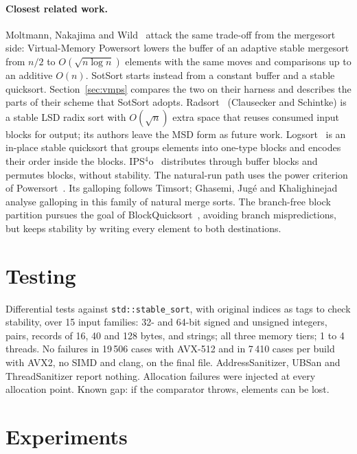 \documentclass[10pt,a4paper]{article}
\begin{document}
\paragraph{Closest related work.} Moltmann, Nakajima and Wild~\cite{vmpowersort} attack the
same trade-off from the mergesort side: Virtual-Memory Powersort lowers the buffer of an adaptive
stable mergesort from $n/2$ to $O(\sqrt{n\log n})$ elements with the same moves and comparisons
up to an additive $O(n)$. SotSort starts instead from a constant buffer and a stable quicksort.
Section~\ref{sec:vmps} compares the two on their harness and describes the parts of their
scheme that SotSort adopts. Radsort~\cite{radsort} (Clausecker and Schintke) is a stable LSD
radix sort with $O(\sqrt n)$ extra space that reuses consumed input blocks for output; its authors
leave the MSD form as future work. Logsort~\cite{logsort} is an in-place stable quicksort that
groups elements into one-type blocks and encodes their order inside the blocks. IPS$^4$o~\cite{ips4o}
distributes through buffer blocks and permutes blocks, without stability. The natural-run path uses the power criterion of
Powersort~\cite{powersort}. Its galloping follows Timsort; Ghasemi, Jugé and
Khalighinejad~\cite{galloping} analyse galloping in this family of natural merge sorts. The
branch-free block partition pursues the goal of BlockQuicksort~\cite{blockqs}, avoiding branch
mispredictions, but keeps stability by writing every element to both destinations.

\section{Testing}\label{sec:tests}
Differential tests against \texttt{std::stable\_sort}, with original indices as tags to check
stability, over 15 input families: 32- and 64-bit signed and unsigned integers, pairs, records of 16, 40 and 128 bytes,
and strings; all three memory tiers; 1 to 4 threads. No failures in 19\,506 cases with AVX-512 and in 7\,410 cases per build with AVX2, no SIMD
and clang, on the final file. AddressSanitizer, UBSan and ThreadSanitizer report nothing.
Allocation failures were injected at every allocation point. Known gap: if the comparator
throws, elements can be lost.

\section{Experiments}\label{sec:exp}
\end{document}
